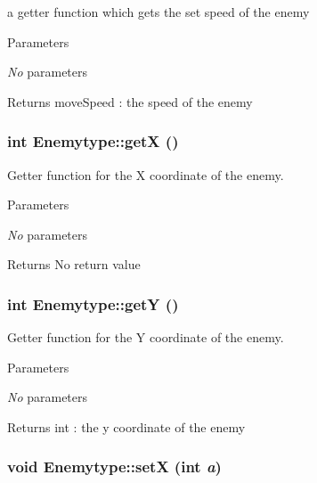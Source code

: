 a getter function which gets the set speed of the enemy 
\begin{DoxyParams}{Parameters}
\item[{\em No}]parameters \end{DoxyParams}
\begin{DoxyReturn}{Returns}
moveSpeed : the speed of the enemy 
\end{DoxyReturn}
\hypertarget{classEnemytype_a641488fb71b330a7104abe92acd0601a}{
\subsubsection[{getX}]{\setlength{\rightskip}{0pt plus 5cm}int Enemytype::getX ()}}
\label{classEnemytype_a641488fb71b330a7104abe92acd0601a}


Getter function for the X coordinate of the enemy. 
\begin{DoxyParams}{Parameters}
\item[{\em No}]parameters \end{DoxyParams}
\begin{DoxyReturn}{Returns}
No return value 
\end{DoxyReturn}
\hypertarget{classEnemytype_aca1ceba65fea5f547abcfaa957c7e5ce}{
\subsubsection[{getY}]{\setlength{\rightskip}{0pt plus 5cm}int Enemytype::getY ()}}
\label{classEnemytype_aca1ceba65fea5f547abcfaa957c7e5ce}


Getter function for the Y coordinate of the enemy. 
\begin{DoxyParams}{Parameters}
\item[{\em No}]parameters \end{DoxyParams}
\begin{DoxyReturn}{Returns}
int : the y coordinate of the enemy 
\end{DoxyReturn}
\hypertarget{classEnemytype_a19472039711c84c97ef8d11921b9e510}{
\subsubsection[{setX}]{\setlength{\rightskip}{0pt plus 5cm}void Enemytype::setX (int {\em a})}}
\label{classEnemytype_a19472039711c84c97ef8d11921b9e510}


